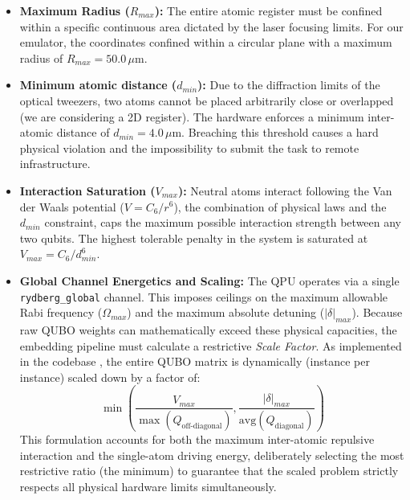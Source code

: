 \begin{itemize}
    \item \textbf{Maximum Radius ($R_{max}$):} The entire atomic register must be confined within a specific continuous area dictated by the laser focusing limits. For our emulator, the coordinates confined within a circular plane with a maximum radius of $R_{max} = 50.0\,\mu\text{m}$.
    
    \item \textbf{Minimum atomic distance ($d_{min}$):} Due to the diffraction limits of the optical tweezers, two atoms cannot be placed arbitrarily close or overlapped (we are considering a 2D register). The hardware enforces a minimum inter-atomic distance of $d_{min} = 4.0\,\mu\text{m}$. Breaching this threshold causes a hard physical violation and the impossibility to submit the task to remote infrastructure.
    
    \item \textbf{Interaction Saturation ($V_{max}$):} Neutral atoms interact following the Van der Waals potential ($V = C_6 / r^6$), the combination of physical laws and the $d_{min}$ constraint, caps the maximum possible interaction strength between any two qubits. The highest tolerable penalty in the system is saturated at $V_{max} = C_6 / d_{min}^6$.
    
    \item \textbf{Global Channel Energetics and Scaling:} The QPU operates via a single \texttt{rydberg\_global} channel. This imposes ceilings on the maximum allowable Rabi frequency ($\Omega_{max}$) and the maximum absolute detuning ($|\delta|_{max}$). Because raw QUBO weights can mathematically exceed these physical capacities, the embedding pipeline must calculate a restrictive \textit{Scale Factor}. As implemented in the codebase \cite{orsucci_qubo_ga_quantum}, the entire QUBO matrix is dynamically (instance per instance) scaled down by a factor of:
    \begin{equation*}
        \min \left( \frac{V_{max}}{\max(Q_{\text{off-diagonal}})}, \frac{|\delta|_{max}}{\text{avg}(Q_{\text{diagonal}})} \right)
    \end{equation*}
    This formulation accounts for both the maximum inter-atomic repulsive interaction and the single-atom driving energy, deliberately selecting the most restrictive ratio (the minimum) to guarantee that the scaled problem strictly respects all physical hardware limits simultaneously.
\end{itemize}

